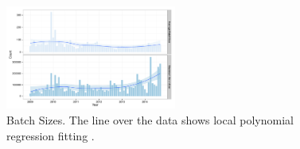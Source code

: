 \begin{figure}[tb]
	\centering
		\includegraphics[width=0.5\textwidth]{figures/batch_size}
	\caption{Batch Sizes. The line over the data shows local polynomial regression fitting \cite{cleveland1992local}.}
	\label{fig:batch_size}
\end{figure}


